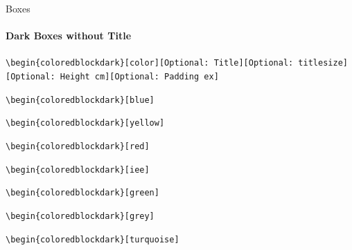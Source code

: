 \documentclass[aspectratio=169]{beamer}
\begin{document}
\begin{frame}{Boxes}
    \framesubtitle{Dark Boxes without Title}

    \footnotesize\centering\texttt{\textbackslash begin\{coloredblockdark\}[color][Optional:~Title][Optional:~titlesize][Optional:~Height cm][Optional:~Padding ex]}
    
    \begin{minipage}[t]{0.49\textwidth}

        \begin{coloredblockdark}[blue]
            \texttt{\textbackslash begin\{coloredblockdark\}[blue]}\strut
        \end{coloredblockdark}

        \begin{coloredblockdark}[yellow]
            \texttt{\textbackslash begin\{coloredblockdark\}[yellow]}\strut
        \end{coloredblockdark}

        \begin{coloredblockdark}[red]
            \texttt{\textbackslash begin\{coloredblockdark\}[red]}\strut
        \end{coloredblockdark}

    \end{minipage}
    \hfill
    \begin{minipage}[t]{0.49\textwidth}
        
        \begin{coloredblockdark}[iee]
            \texttt{\textbackslash begin\{coloredblockdark\}[iee]}\strut
        \end{coloredblockdark}

        \begin{coloredblockdark}[green]
            \texttt{\textbackslash begin\{coloredblockdark\}[green]}\strut
        \end{coloredblockdark}

        \begin{coloredblockdark}[grey]
            \texttt{\textbackslash begin\{coloredblockdark\}[grey]}\strut
        \end{coloredblockdark}
        
    \end{minipage}

    \centering
    \begin{minipage}[t]{0.49\textwidth}
        \begin{coloredblockdark}[turquoise]
                \texttt{\textbackslash begin\{coloredblockdark\}[turquoise]}\strut
        \end{coloredblockdark}
        
    \end{minipage}
\end{frame}
\end{document}
